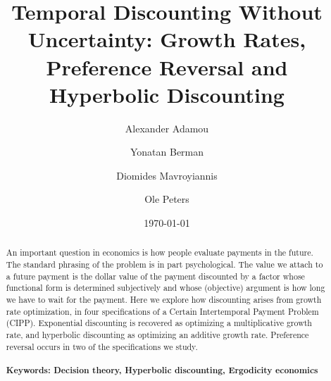 \documentclass[11pt]{article}
\numberwithin{equation}{section}
\begin{document}
\begin{titlepage}
\title{Temporal Discounting Without Uncertainty: Growth Rates, Preference Reversal and Hyperbolic Discounting}
\author{Alexander Adamou \and Yonatan Berman \and Diomides Mavroyiannis \and Ole Peters}
\date{\today}
\maketitle
\begin{abstract}
\noindent An important question in economics is how people evaluate payments in the future. The standard phrasing of the problem is in part psychological. The value we attach to a future payment is the dollar value of the payment discounted by a factor whose functional form is determined subjectively and whose (objective) argument is how long we have to wait for the payment. Here we explore how discounting arises from growth rate optimization, in four specifications of a Certain Intertemporal Payment Problem (CIPP). Exponential discounting is recovered as optimizing a multiplicative growth rate, and hyperbolic discounting as optimizing an additive growth rate. Preference reversal occurs in two of the specifications we study.
\\
\\
\noindent\textbf{Keywords: Decision theory, Hyperbolic discounting, Ergodicity economics}
\\

\bigskip
\end{abstract}
\setcounter{page}{0}
\thispagestyle{empty}
\end{titlepage}
\pagebreak \newpage
\end{document}
